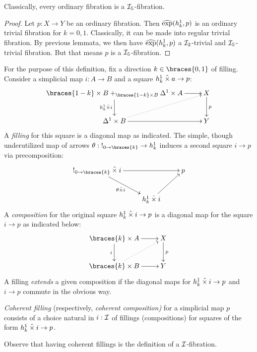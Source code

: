\documentclass[reqno,10pt,a4paper,oneside]{amsart}
\begin{document}
\begin{lemma}
Classically, every ordinary fibration is a $\cal{I}_5$-fibration.
\end{lemma}

\begin{proof}
Let $p : X \to Y$ be an ordinary fibration.
Then $\hatexp(h_k^1, p)$ is an ordinary trivial fibration for $k = 0, 1$.
Classically, it can be made into regular trivial fibration.
By previous lemmata, we then have $\hatexp(h_k^1, p)$ a $\cal{I}_2$-trivial and $\cal{I}_5$-trivial fibration.
But that means $p$ is a $\cal{I}_5$-fibration.
\end{proof}

\begin{definition}
For the purpose of this definition, fix a direction $k \in \braces{0, 1}$ of filling.
Consider a simplicial map $i : A \to B$ and a square $h_k^1 \hattimes a \to p$:
\[
\xymatrix{
  \braces{1-k} \times B +_{\braces{1-k} \times B} \Delta^1 \times A
  \ar[r]
  \ar[d]_{h_k^1 \hattimes i}
&
  X
  \ar[d]^{p}
\\
  \Delta^1 \times B
  \ar[r]
  \ar@{.>}[ur]
&
  Y
}
\]
A \emph{filling} for this square is a diagonal map as indicated.
The simple, though underutilized map of arrows $\theta : \canonical_{0 \to \braces{k}} \to h_k^1$ induces a second square $i \to p$ via precomposition:
\[
\xymatrix{
  \canonical_{0 \to \braces{k}} \hattimes i
  \ar[rr]
  \ar[dr]_{\theta \hattimes i}
&&
  p
\\&
  h_k^1 \hattimes i
  \ar[ur]
}
\]
A \emph{composition} for the original square $h_k^1 \hattimes i \to p$ is a diagonal map for the square $i \to p$ as indicated below:
\[
\xymatrix{
  \braces{k} \times A
  \ar[r]
  \ar[d]_{i}
&
  X
  \ar[d]^{p}
\\
  \braces{k} \times B
  \ar[r]
  \ar@{.>}[ur]
&
  Y
}
\]
A filling \emph{extends} a given composition if the diagonal maps for $h_k^1 \hattimes i \to p$ and $i \to p$ commute in the obvious way.
\end{definition}

\begin{definition}
\emph{Coherent filling} (respectively, \emph{coherent composition)} for a simplicial map $p$ consists of a choice natural in $i : \cal{I}$ of fillings (compositions) for squares of the form $h_k^1 \hattimes i \to p$.
\end{definition}

Observe that having coherent fillings is the definition of a $\cal{I}$-fibration.
\end{document}

